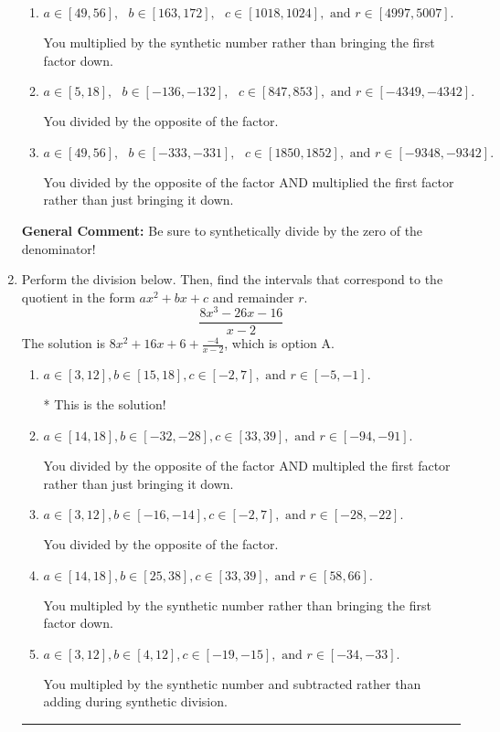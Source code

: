 \documentclass{extbook}[14pt]
\newcommand{\litem}[1]{\item #1

\rule{\textwidth}{0.4pt}}
\begin{document}
\begin{enumerate}
{\begin{enumerate}[label=\Alph*.]
* This is the solution!
\item \( a \in [49, 56], \text{   } b \in [163, 172], \text{   } c \in [1018, 1024], \text{   and   } r \in [4997, 5007]. \)

 You multiplied by the synthetic number rather than bringing the first factor down.
\item \( a \in [5, 18], \text{   } b \in [-136, -132], \text{   } c \in [847, 853], \text{   and   } r \in [-4349, -4342]. \)

 You divided by the opposite of the factor.
\item \( a \in [49, 56], \text{   } b \in [-333, -331], \text{   } c \in [1850, 1852], \text{   and   } r \in [-9348, -9342]. \)

 You divided by the opposite of the factor AND multiplied the first factor rather than just bringing it down.
\end{enumerate}

\textbf{General Comment:} Be sure to synthetically divide by the zero of the denominator!
}
\litem{
Perform the division below. Then, find the intervals that correspond to the quotient in the form $ax^2+bx+c$ and remainder $r$.
\[ \frac{8x^{3} -26 x -16}{x -2} \]The solution is \( 8x^{2} +16 x + 6 + \frac{-4}{x -2} \), which is option A.\begin{enumerate}[label=\Alph*.]
\item \( a \in [3, 12], b \in [15, 18], c \in [-2, 7], \text{ and } r \in [-5, -1]. \)

* This is the solution!
\item \( a \in [14, 18], b \in [-32, -28], c \in [33, 39], \text{ and } r \in [-94, -91]. \)

 You divided by the opposite of the factor AND multipled the first factor rather than just bringing it down.
\item \( a \in [3, 12], b \in [-16, -14], c \in [-2, 7], \text{ and } r \in [-28, -22]. \)

 You divided by the opposite of the factor.
\item \( a \in [14, 18], b \in [25, 38], c \in [33, 39], \text{ and } r \in [58, 66]. \)

 You multipled by the synthetic number rather than bringing the first factor down.
\item \( a \in [3, 12], b \in [4, 12], c \in [-19, -15], \text{ and } r \in [-34, -33]. \)

 You multipled by the synthetic number and subtracted rather than adding during synthetic division.
\end{enumerate}

}
\end{enumerate}
\end{document}
